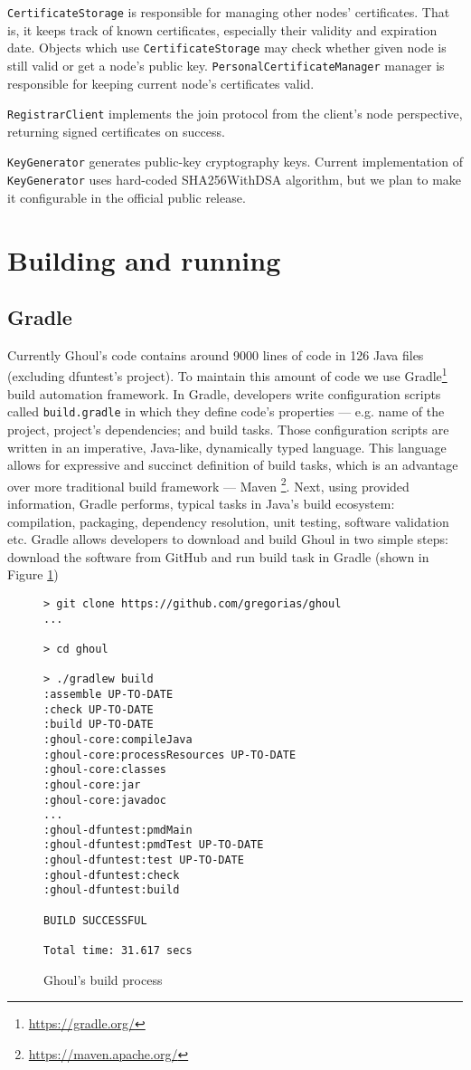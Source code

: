 \texttt{CertificateStorage} is responsible for managing other nodes'
certificates.
That is, it keeps track of known certificates, especially their validity and
expiration date.
Objects which use \texttt{CertificateStorage} may check whether given node
is still valid or get a node's public key.
\texttt{PersonalCertificateManager} manager is responsible for keeping current
node's certificates valid.

\texttt{RegistrarClient} implements the join protocol from the client's node
perspective, returning signed certificates on success.

\texttt{KeyGenerator} generates public-key cryptography keys. 
Current implementation of \texttt{KeyGenerator} uses hard-coded SHA256WithDSA
algorithm, but we plan to make it configurable in the official public release.

\section{Building and running}
\label{sec:build}

\subsection{Gradle}
Currently Ghoul's code contains around 9000 lines of code in 126 Java files
(excluding dfuntest's project).
To maintain this amount of code we use
Gradle\footnote{\url{https://gradle.org/}} build automation framework.
In Gradle, developers write configuration scripts called \texttt{build.gradle}
in which they define code's properties --- e.g. name of the project, project's
dependencies; and build tasks.
Those configuration scripts are written in an imperative, Java-like, dynamically
typed language.
This language allows for expressive and succinct definition of build tasks,
which is an advantage over more traditional build framework --- Maven
\footnote{\url{https://maven.apache.org/}}.
Next, using provided information, Gradle performs, typical tasks in Java's build
ecosystem: compilation, packaging, dependency resolution, unit testing, software
validation etc.
Gradle allows developers to download and build Ghoul in two simple steps:
download the software from GitHub and run build task in Gradle (shown in Figure
\ref{fig:ghoul_build_process})

\begin{figure}[tb]
\begin{verbatim}
> git clone https://github.com/gregorias/ghoul
...

> cd ghoul

> ./gradlew build
:assemble UP-TO-DATE
:check UP-TO-DATE
:build UP-TO-DATE
:ghoul-core:compileJava
:ghoul-core:processResources UP-TO-DATE
:ghoul-core:classes
:ghoul-core:jar
:ghoul-core:javadoc
...
:ghoul-dfuntest:pmdMain
:ghoul-dfuntest:pmdTest UP-TO-DATE
:ghoul-dfuntest:test UP-TO-DATE
:ghoul-dfuntest:check
:ghoul-dfuntest:build

BUILD SUCCESSFUL

Total time: 31.617 secs
\end{verbatim}
\caption{Ghoul's build process}
\label{fig:ghoul_build_process}
\end{figure}

